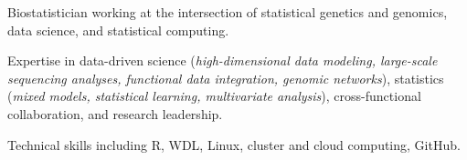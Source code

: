 

\begin{cvparagraph}

Biostatistician working at the intersection of statistical genetics and genomics, data science, and statistical computing. 

Expertise in data-driven science (\textit{high-dimensional data modeling, large-scale sequencing analyses, functional data integration, genomic networks}), statistics (\textit{mixed models, statistical learning, multivariate analysis}), cross-functional collaboration, and research leadership. 
 
Technical skills including R, WDL, Linux, cluster and cloud computing, GitHub. 
\end{cvparagraph}
